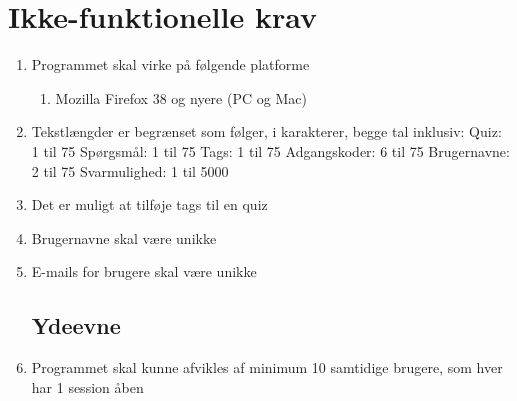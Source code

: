 \section{Ikke-funktionelle krav}
\label{sec:nonFunctional}

\begin{enumerate}
	\subsection*{Brugbarhed}
	\item Programmet skal virke på følgende platforme
	\begin{enumerate}
		\item Mozilla Firefox 38 og nyere (PC og Mac)
	\end{enumerate}
	
	\item Tekstlængder er begrænset som følger, i karakterer, begge tal inklusiv:
	\subitem Quiz: 1 til 75
	\subitem Spørgsmål: 1 til 75
	\subitem Tags: 1 til 75 
	\subitem Adgangskoder: 6 til 75
	\subitem Brugernavne: 2 til 75
	\subitem Svarmulighed: 1 til 5000
	\item Det er muligt at tilføje tags til en quiz
	\item Brugernavne skal være unikke
	\item E-mails for brugere skal være unikke
	
	\subsection*{Ydeevne}
	\item Programmet skal kunne afvikles af minimum 10 samtidige brugere, som hver har 1 session åben
\end{enumerate}